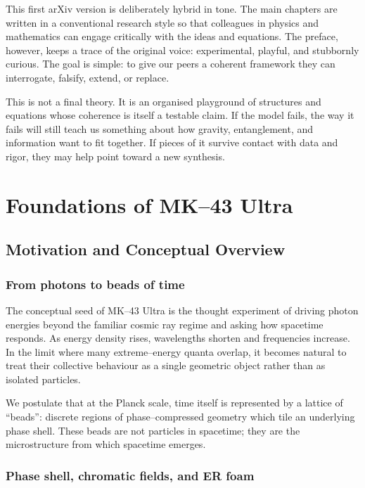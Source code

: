 This first arXiv version is deliberately hybrid in tone.
The main chapters are written in a conventional research style so that colleagues in physics and mathematics can engage critically with the ideas and equations.
The preface, however, keeps a trace of the original voice: experimental, playful, and stubbornly curious.
The goal is simple: to give our peers a coherent framework they can interrogate, falsify, extend, or replace.

This is not a final theory.
It is an organised playground of structures and equations whose coherence is itself a testable claim.
If the model fails, the way it fails will still teach us something about how gravity, entanglement, and information want to fit together.
If pieces of it survive contact with data and rigor, they may help point toward a new synthesis.

\mainmatter

\part{Foundations of MK--43 Ultra}

\chapter{Motivation and Conceptual Overview}

\section{From photons to beads of time}

The conceptual seed of MK--43 Ultra is the thought experiment of driving photon energies beyond the familiar cosmic ray regime and asking how spacetime responds.
As energy density rises, wavelengths shorten and frequencies increase.
In the limit where many extreme--energy quanta overlap, it becomes natural to treat their collective behaviour as a single geometric object rather than as isolated particles.

We postulate that at the Planck scale, time itself is represented by a lattice of ``beads'':
discrete regions of phase--compressed geometry which tile an underlying phase shell.
These beads are not particles in spacetime; they are the microstructure from which spacetime emerges.

\section{Phase shell, chromatic fields, and ER foam}

